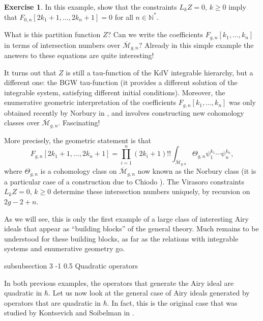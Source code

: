 \documentclass[reqno,oneside,11pt]{amsart}
\makeatletter
\theoremstyle{plain}
\theoremstyle{definition}
\newtheorem*{exercise}{Exercise}
\theoremstyle{remark}
\numberwithin{equation}{section}
\renewcommand{\subsubsection}{\@startsection
{subsubsection}%
{3}%
{\z@}%
{-1\baselineskip}%
{0.5\baselineskip}%
{\normalfont \it \normalsize}} %
\makeatother
\begin{document}
\begin{exercise}
In this example, show that the constraints $L_k Z = 0$, $k \geq 0$ imply that $F_{0,n}[2k_1+1, \ldots, 2k_n+1] =0$ for all $n \in \mathbb{N}^*$.
\end{exercise}

What is this partition function $Z$? Can we write the coefficients $F_{g,n}[k_1, \ldots, k_n]$ in terms of intersection numbers over $\overline{\mathcal{M}}_{g,n}$? Already in this simple example the answers to these equations are quite interesting!

It turns out that $Z$ is still a tau-function of the KdV integrable hierarchy, but a different one: the BGW tau-function (it provides a different solution of the integrable system, satisfying different initial conditions). Moreover, the enumerative geometric interpretation of the coefficients $F_{g,n}[k_1,\ldots,k_n]$ was only obtained recently by Norbury in \cite{No17}, and involves constructing new cohomology classes over $\overline{\mathcal{M}}_{g,n}$. Fascinating!

More precisely, the geometric statement is that
\begin{equation}\label{eq:norbury}
F_{g,n}[2k_1+1, \ldots, 2k_n+1] = \prod_{i=1}^n (2k_i+1)!! \int_{\overline{\mathcal{M}}_{g,n}} \Theta_{g,n} \psi_1^{k_1} \cdots \psi_n^{k_n},
\end{equation}
where $\Theta_{g,n}$ is a cohomology class on $\overline{\mathcal{M}}_{g,n}$ now known as the Norbury class (it is a particular case of a construction due to Chiodo \cite{Ch06}). The Virasoro constraints  $L_k Z = 0$, $k \geq 0$ determine these intersection numbers uniquely, by recursion on $2g-2+n$.

As we will see, this is only the first example of a large class of interesting Airy ideals that appear as ``building blocks'' of the general theory. Much remains to be understood for these building blocks, as far as the relations with integrable systems and enumerative geometry go.


\subsubsection{Quadratic operators}

In both previous examples, the operators that generate the Airy ideal are quadratic in $\hbar$. Let us now look at the general case of Airy ideals generated by operators that are quadratic in $\hbar$. In fact, this is the original case that was studied by Kontsevich and Soibelman in \cite{KS17}.
\end{document}
